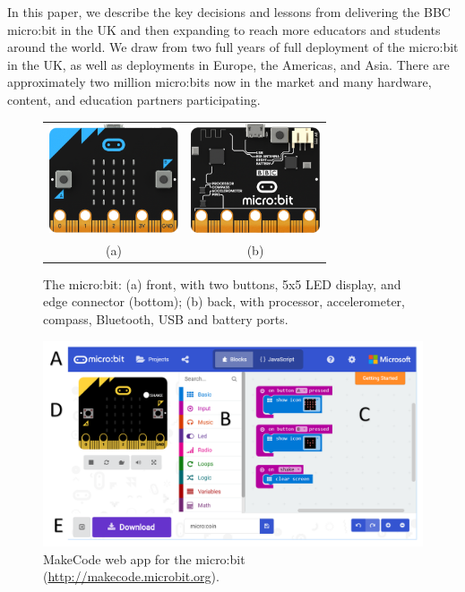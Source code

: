 In this paper, we describe the key decisions and lessons from
delivering the BBC micro:bit in the UK and then expanding to reach
more educators and students around the world.
We draw from two full years of
full deployment of the micro:bit in the UK, as well as deployments
in Europe, the Americas, and Asia.  There are approximately
two million micro:bits now in the market and many hardware,
content, and education partners participating.




\begin{figure}
  \begin{tabular}{cc}
    \includegraphics[width=1.5in]{images/microbit-front.png} &
    \includegraphics[width=1.5in]{images/microbit-back.png} \\
    (a) & (b)
  \end{tabular}
  \caption{\label{fig:microbit}The micro:bit: (a) front, with two buttons,
    5x5 LED display, and edge connector (bottom); (b) back, with processor, accelerometer, compass, Bluetooth, USB and battery ports.}
  \end{figure}

  \begin{figure}[t]
    \includegraphics[width=6in]{images/webApp.png}
    \caption{\label{fig:snapshot}MakeCode web app for the micro:bit (\url{http://makecode.microbit.org}).}
  \end{figure}

